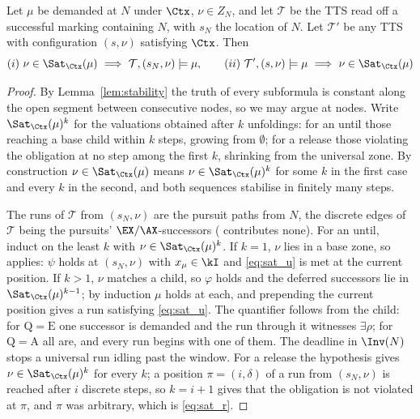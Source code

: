 \begin{lemma}\label{lem:sat}
Let $\mu$ be demanded at $N$ under $\Ctx$, $\nu\in Z_N$, and let $\mathcal{T}$ be the TTS read off a
successful marking containing $N$, with $s_N$ the location of $N$. Let $\mathcal{T}'$ be any TTS with
configuration $(s,\nu)$ satisfying $\Ctx$. Then
\[
  (i)\ \nu\in\Sat_{\Ctx}(\mu)\ \Longrightarrow\ \mathcal{T},(s_N,\nu)\models\mu,
  \qquad
  (ii)\ \mathcal{T}',(s,\nu)\models\mu\ \Longrightarrow\ \nu\in\Sat_{\Ctx}(\mu)
\]
\end{lemma}
\begin{proof}
By Lemma~\ref{lem:stability} the truth of every subformula is constant along the open segment between
consecutive nodes, so we may argue at nodes. Write $\Sat_{\Ctx}(\mu)^{k}$ for the valuations obtained
after $k$ unfoldings: for an until those reaching a base child within $k$ steps, growing from
$\emptyset$; for a release those violating the obligation at no step among the first $k$, shrinking
from the universal zone. By construction $\nu\in\Sat_{\Ctx}(\mu)$ means $\nu\in\Sat_{\Ctx}(\mu)^{k}$
for some $k$ in the first case and every $k$ in the second, and both sequences stabilise in finitely
many steps.

\textit{} The runs of $\mathcal{T}$ from $(s_N,\nu)$ are the pursuit paths from
$N$, the discrete edges of $\mathcal{T}$ being the pursuits' $\EX/\AX$-successors (
contributes none). For an until, induct on the least $k$ with $\nu\in\Sat_{\Ctx}(\mu)^{k}$. If $k=1$,
$\nu$ lies in a base zone, so  applies: $\psi$ holds at $(s_N,\nu)$ with
$x_\mu\in\kI$ and \eqref{eq:sat_u} is met at the current position. If $k>1$, $\nu$ matches a
 child, so $\varphi$ holds and the deferred successors lie in $\Sat_{\Ctx}(\mu)^{k-1}$;
by induction $\mu$ holds at each, and prepending the current position gives a run satisfying
\eqref{eq:sat_u}. The quantifier follows from the child: for $\mathrm{Q}=\mathrm{E}$ one successor is
demanded and the run through it witnesses $\exists\rho$; for $\mathrm{Q}=\mathrm{A}$ all are, and
every run begins with one of them. The deadline in $\Inv(N)$ stops a universal run idling past the
window. For a release the hypothesis gives $\nu\in\Sat_{\Ctx}(\mu)^{k}$ for every $k$; a position
$\pi=(i,\delta)$ of a run from $(s_N,\nu)$ is reached after $i$ discrete steps, so $k=i+1$ gives that
the obligation is not violated at $\pi$, and $\pi$ was arbitrary, which is \eqref{eq:sat_r}.


\end{proof}
